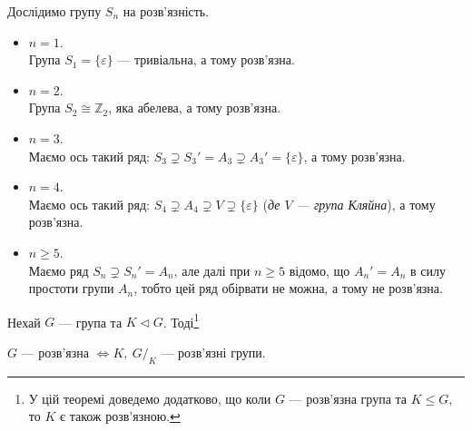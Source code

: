 \documentclass{math_library}
\begin{document}
\begin{example}
Дослідимо групу $S_n$ на розв'язність.
\begin{itemize}[wide=0pt]
\item $n = 1$.\\
Група $S_1 = \{\varepsilon\}$ --- тривіальна, а тому розв'язна.

\item $n = 2$.\\
Група $S_2 \cong \mathbb{Z}_2$, яка абелева, а тому розв'язна.

\item $n = 3$.\\
Маємо ось такий ряд: $S_3 \supsetneq S_3' = A_3 \supsetneq A_3' = \{\varepsilon\}$, а тому розв'язна.

\item $n = 4$.\\
Маємо ось такий ряд: $S_4 \supsetneq A_4 \supsetneq V \supsetneq \{\varepsilon\}$ (\textit{де $V$ --- група Кляйна}), а тому розв'язна.

\item $n \geq 5$.\\
Маємо ряд $S_n \supsetneq S_n' = A_n$, але далі при $n \geq 5$ відомо, що $A_n' = A_n$ в силу простоти групи $A_n$, тобто цей ряд обірвати не можна, а тому не розв'язна.
\end{itemize}
\end{example}

\begin{theorem}
Нехай $G$ --- група та $K \triangleleft G$. Тоді\footnote{У цій теоремі доведемо додатково, що коли $G$ --- розв'язна група та $K \leq G$, то $K$ є також розв'язною.}
\begin{center}
$G$ --- розв'язна $\iff K,\ G/_K$ --- розв'язні групи.
\end{center}
\end{theorem}
\end{document}
